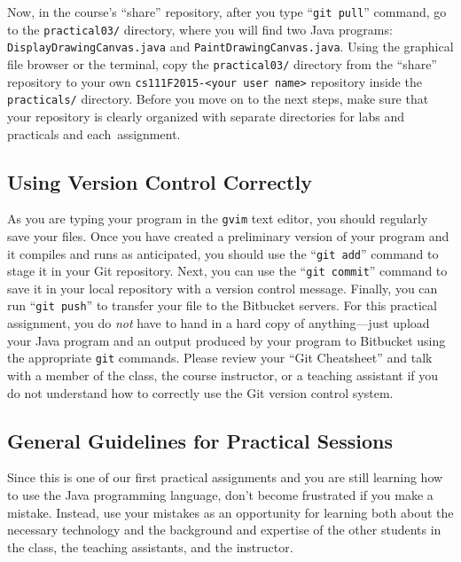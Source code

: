 Now, in the course's ``share'' repository, after you type ``{\tt git pull}'' command, go to the {\tt practical03/}
directory, where you will find two Java programs: {\tt DisplayDrawingCanvas.java} and {\tt PaintDrawingCanvas.java}.
Using the graphical file browser or the terminal, copy the {\tt practical03/} directory from the ``share''
repository to your own {\tt cs111F2015-<your user name>} repository inside the {\tt practicals/} directory. Before you
move on to the next steps, make sure that your repository is clearly organized with separate directories for labs and
practicals and \mbox{each assignment}.


\subsection*{Using Version Control Correctly}

As you are typing your program in the {\tt gvim} text editor, you should regularly save your files.  Once you have
created a preliminary version of your program and it compiles and runs as anticipated, you should use the ``{\tt git
add}'' command to stage it in your Git repository.  Next, you can use the ``{\tt git commit}'' command to save it in
your local repository with a version control message.  Finally, you can run ``{\tt git push}'' to transfer your file to
the Bitbucket servers.  For this practical assignment, you do {\em not} have to hand in a hard copy of anything---just
upload your Java program and an output produced by your program to Bitbucket using the appropriate {\tt git} commands.
Please review your ``Git Cheatsheet'' and talk with a member of the class, the course instructor, or a teaching
assistant if you do not understand how to correctly use the Git version control system.






\vspace*{-.2in}
\subsection*{General Guidelines for Practical Sessions}

Since this is one of our first practical assignments and you are still learning how to use the Java programming
language, don't become frustrated if you make a mistake. Instead, use your mistakes as an opportunity for learning both
about the necessary technology and the background and expertise of the other students in the class, the teaching
assistants, and the instructor.

